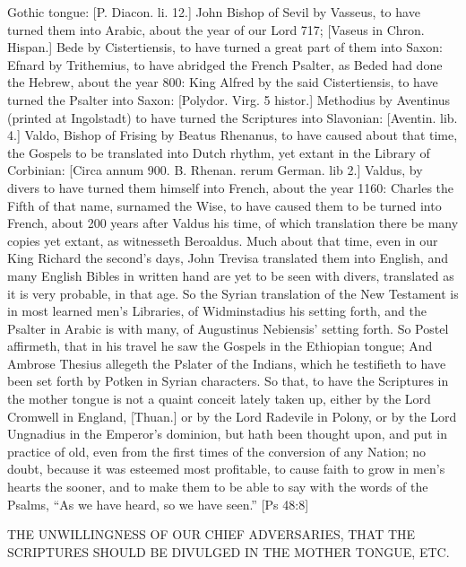 {Gothic tongue: [P. Diacon. li. 12.] John Bishop of Sevil by Vasseus, to have turned them into Arabic, about the year of our Lord 717; [Vaseus in Chron. Hispan.] Bede by Cistertiensis, to have turned a great part of them into Saxon: Efnard by Trithemius, to have abridged the French Psalter, as Beded had done the Hebrew, about the year 800: King Alfred by the said Cistertiensis, to have turned the Psalter into Saxon: [Polydor. Virg. 5 histor.] Methodius by Aventinus (printed at Ingolstadt) to have turned the Scriptures into Slavonian: [Aventin. lib. 4.] Valdo, Bishop of Frising by Beatus Rhenanus, to have caused about that time, the Gospels to be translated into Dutch rhythm, yet extant in the Library of Corbinian: [Circa annum 900. B. Rhenan. rerum German. lib 2.] Valdus, by divers to have turned them himself into French, about the year 1160: Charles the Fifth of that name, surnamed the Wise, to have caused them to be turned into French, about 200 years after Valdus his time, of which translation there be many copies yet extant, as witnesseth Beroaldus. Much about that time, even in our King Richard the second’s days, John Trevisa translated them into English, and many English Bibles in written hand are yet to be seen with divers, translated as it is very probable, in that age. So the Syrian translation of the New Testament is in most learned men’s Libraries, of Widminstadius his setting forth, and the Psalter in Arabic is with many, of Augustinus Nebiensis’ setting forth. So Postel affirmeth, that in his travel he saw the Gospels in the Ethiopian tongue; And Ambrose Thesius allegeth the Pslater of the Indians, which he testifieth to have been set forth by Potken in Syrian characters. So that, to have the Scriptures in the mother tongue is not a quaint conceit lately taken up, either by the Lord Cromwell in England, [Thuan.] or by the Lord Radevile in Polony, or by the Lord Ungnadius in the Emperor’s dominion, but hath been thought upon, and put in practice of old, even from the first times of the conversion of any Nation; no doubt, because it was esteemed most profitable, to cause faith to grow in men’s hearts the sooner, and to make them to be able to say with the words of the Psalms, “As we have heard, so we have seen.” [Ps 48:8]
\par }{\IS THE UNWILLINGNESS OF OUR CHIEF ADVERSARIES, THAT THE SCRIPTURES SHOULD BE DIVULGED IN THE MOTHER TONGUE, ETC.
}
